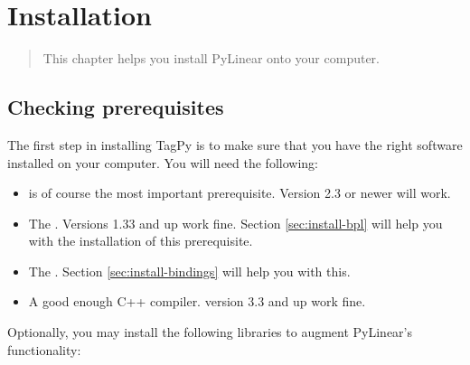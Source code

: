 \chapter{Installation}
\label{cha:installation}

\begin{quote}
   This chapter helps you install PyLinear onto your computer.
\end{quote}

\section{Checking prerequisites}

The first step in installing TagPy is to make sure that you have the
right software installed on your computer. You will need the
following:

\begin{itemize}
  \item {} is of course
    the most important prerequisite. Version 2.3 or newer will work.
  \item The . 
    Versions 1.33 and up work fine. Section \ref{sec:install-bpl}
    will help you with the installation of this prerequisite.
  \item The
    . Section \ref{sec:install-bindings} will
    help you with this.
  \item A good enough C++ compiler. 
    version 3.3 and up work fine.
\end{itemize}

Optionally, you may install the following libraries to augment
PyLinear's functionality:

